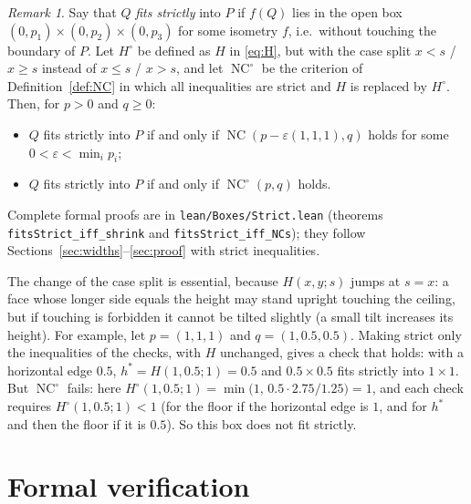 \documentclass[11pt]{article}
\theoremstyle{definition}
\theoremstyle{remark}
\newtheorem{remark}[theorem]{Remark}
\newcommand{\NC}{\operatorname{NC}}
\begin{document}
\begin{remark}\label{rem:strict}
Say that $Q$ \emph{fits strictly} into $P$ if $f(Q)$ lies in the open box
$(0,p_1)\times(0,p_2)\times(0,p_3)$ for some isometry $f$, i.e.\ without touching the boundary of $P$.
Let $H^\circ$ be defined as $H$ in \eqref{eq:H}, but with the case split $x<s$ / $x\ge s$ instead of
$x\le s$ / $x>s$, and let $\NC^\circ$ be the criterion of Definition~\ref{def:NC} in which all
inequalities are strict and $H$ is replaced by $H^\circ$. Then, for $p>0$ and $q\ge0$:
\begin{itemize}
\item $Q$ fits strictly into $P$ if and only if $\NC(p-\varepsilon(1,1,1),q)$ holds for some
$0<\varepsilon<\min_ip_i$;
\item $Q$ fits strictly into $P$ if and only if $\NC^\circ(p,q)$ holds.
\end{itemize}
Complete formal proofs are in \texttt{lean/Boxes/Strict.lean} (theorems
\texttt{fitsStrict\_iff\_shrink} and \texttt{fitsStrict\_iff\_NCs}); they follow
Sections~\ref{sec:widths}--\ref{sec:proof} with strict inequalities.

The change of the case split is essential, because $H(x,y;s)$ jumps at $s=x$: a face whose longer side
equals the height may stand upright touching the ceiling, but if touching is forbidden it cannot be
tilted slightly (a small tilt increases its height). For example, let $p=(1,1,1)$ and
$q=(1,0.5,0.5)$. Making strict only the inequalities of the checks, with $H$ unchanged, gives a check that
holds: with a horizontal edge $0.5$, $h^*=H(1,0.5;1)=0.5$ and $0.5\times0.5$ fits strictly into $1\times1$. But $\NC^\circ$ fails:
here $H^\circ(1,0.5;1)=\min\bigl(1,\,0.5\cdot2.75/1.25\bigr)=1$, and each check requires
$H^\circ(1,0.5;1)<1$ (for the floor if the horizontal edge is $1$, and for $h^*$ and then the floor if it
is $0.5$). So this box does not fit strictly.
\end{remark}

\section{Formal verification}\label{sec:lean}
\end{document}
